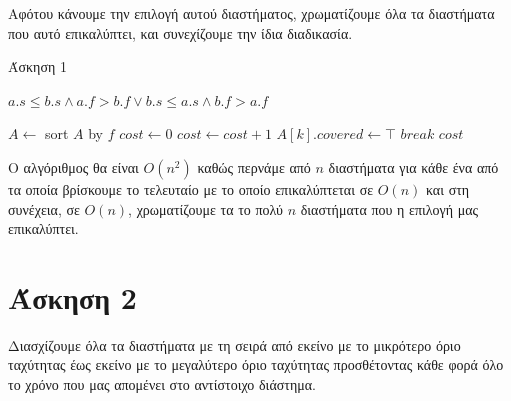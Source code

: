 \documentclass[11pt,a4paper]{book}
\begin{document}
Αφότου κάνουμε την επιλογή αυτού διαστήματος, χρωματίζουμε όλα τα διαστήματα που αυτό επικαλύπτει, και συνεχίζουμε την ίδια διαδικασία.

\begin{algorithm}[H]
\caption{\textgreek{Άσκηση 1}}
\begin{algorithmic}[1]
	\State \Return $a.s \leq b.s \land a.f > b.f \lor b.s \leq a.s \land b.f > a.f$
\EndProcedure

	\EndFor
	\State $A \gets $ sort $A$ by $f$
	\State $cost \gets 0$
					\State $cost \gets cost + 1$
							\State $A[ k ].covered \gets \top$
						\EndIf
					\EndFor
					\State $break$
				\EndIf
			\EndFor
		\EndIf
	\EndFor
	\State \Return $cost$
\EndProcedure
\end{algorithmic}
\end{algorithm}

Ο αλγόριθμος θα είναι $O( n^2 )$ καθώς περνάμε από $n$ διαστήματα για κάθε ένα από τα οποία βρίσκουμε το τελευταίο με το οποίο επικαλύπτεται σε $O( n )$ και στη συνέχεια, σε $O( n )$, χρωματίζουμε τα το πολύ $n$ διαστήματα που η επιλογή μας επικαλύπτει.

\section*{Άσκηση 2}
Διασχίζουμε όλα τα διαστήματα με τη σειρά από εκείνο με το μικρότερο όριο ταχύτητας έως εκείνο με το μεγαλύτερο όριο ταχύτητας προσθέτοντας κάθε φορά όλο το χρόνο που μας απομένει στο αντίστοιχο διάστημα.
\end{document}
